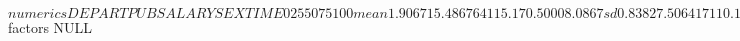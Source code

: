 \begin{Schunk}
\begin{Soutput}
$numerics
       DEPART      PUB       SALARY      SEX     TIME
0%     1.0000   1.0000     30832.84   0.0000   1.0000
25%    1.0000  10.0000     51166.33   0.0000   4.0000
50%    2.0000  16.0000     63076.18   0.5000   7.0000
75%    3.0000  20.0000     76661.51   1.0000  11.7500
100%   3.0000  39.0000    108452.61   1.0000  25.0000
mean   1.9067  15.4867     64115.17   0.5000   8.0867
sd     0.8382   7.5064     17110.15   0.5017   5.2379
var    0.7026  56.3455 292757150.43   0.2517  27.4354
NA's   0.0000   0.0000         0.00   0.0000   0.0000
N    150.0000 150.0000       150.00 150.0000 150.0000

$factors
NULL
\end{Soutput}
\end{Schunk}
